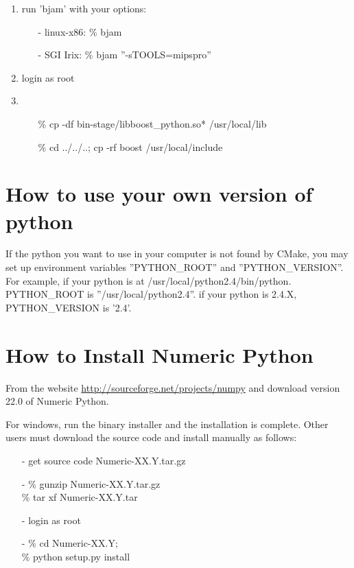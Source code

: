 \begin{enumerate}
     \item
       run 'bjam' with your options:
       \begin{itemize}
	 \item[-] linux-x86: {\color[named]{Blue}\% bjam}
	 \item[-] SGI Irix: {\color[named]{Blue}\% bjam ''-sTOOLS=mipspro''}
       \end{itemize}

     \item
       login as root
    
     \item
       \color[named]{Blue}
       \begin{itemize}
	 \item[\%] cp -df bin-stage/libboost\_python.so* /usr/local/lib
	 \item[\%] cd ../../..; cp -rf boost /usr/local/include
       \end{itemize}
       \normalcolor

  \end{enumerate}


\section{How to use your own version of python}

   If the python you want to use in your computer is not found by CMake,
    you may set up environment variables ''PYTHON\_ROOT'' and
    ''PYTHON\_VERSION''. For example, if your python is at
    /usr/local/python2.4/bin/python. PYTHON\_ROOT is
    ''/usr/local/python2.4''. if your python is 2.4.X, PYTHON\_VERSION
    is '2.4'.

\section{How to Install Numeric Python}
   From the website
    \href{http://sourceforge.net/projects/numpy}{http://sourceforge.net/projects/numpy}
    and download 
    version 22.0 of Numeric Python.
 
    For windows, run the binary installer and the installation is
    complete.  Other users must download the source code and install
    manually as follows:

    \begin{itemize}
      \item[-] get source code Numeric-XX.Y.tar.gz
      \color[named]{Blue}
      \item[-] \% gunzip Numeric-XX.Y.tar.gz \\
	\% tar xf Numeric-XX.Y.tar
      \normalcolor
      \item[-] login as root
      \color[named]{Blue}
      \item[-] \% cd Numeric-XX.Y; \\
	\% python setup.py install
      \normalcolor
    \end{itemize}



%